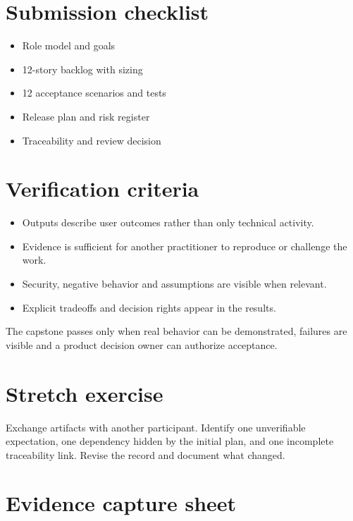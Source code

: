 \documentclass[11pt,letterpaper]{article}
\begin{document}
\section{Submission checklist}
\begin{itemize}[leftmargin=*,itemsep=2pt]
\item Role model and goals
\item 12-story backlog with sizing
\item 12 acceptance scenarios and tests
\item Release plan and risk register
\item Traceability and review decision
\end{itemize}
\section{Verification criteria}
\begin{itemize}[leftmargin=*,itemsep=2pt]
\item Outputs describe user outcomes rather than only technical activity.
\item Evidence is sufficient for another practitioner to reproduce or challenge the work.
\item Security, negative behavior and assumptions are visible when relevant.
\item Explicit tradeoffs and decision rights appear in the results.
\end{itemize}
\begin{tcolorbox}[colback=amberback,colframe=navy,title={Instructor note / expected reasoning},breakable]
The capstone passes only when real behavior can be demonstrated, failures are visible and a product decision owner can authorize acceptance.

\end{tcolorbox}
\section{Stretch exercise}
Exchange artifacts with another participant. Identify one unverifiable expectation, one dependency hidden by the initial plan, and one incomplete traceability link. Revise the record and document what changed.

\section{Evidence capture sheet}
\end{document}
